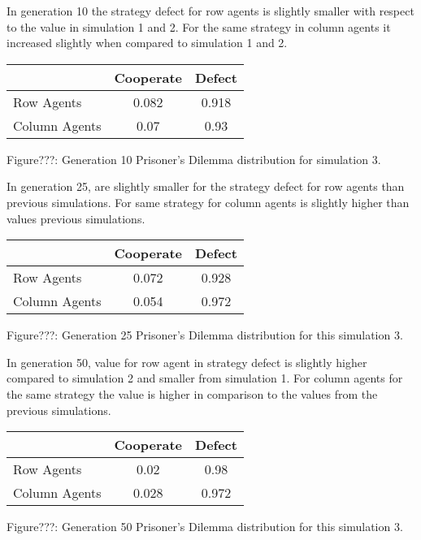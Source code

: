 \documentclass{article}
\begin{document}
In generation 10 the strategy defect for row agents is slightly smaller with respect to the value in simulation 1 and 2. For the same strategy in column agents it increased slightly when compared to simulation 1 and 2.
\begin{center}
\begin{tabular}{|l|c|c|}
\hline
& Cooperate & Defect \\ 
\hline
Row Agents & 0.082 & 0.918\\
\hline
Column Agents & 0.07 & 0.93\\
\hline
\end{tabular}
\end{center}
\begin{center}
Figure???: Generation 10 Prisoner’s Dilemma distribution for simulation 3.
\end{center}

In generation 25, are slightly smaller for the strategy defect for row agents than previous simulations. For same strategy for column agents is slightly higher than values previous simulations.
\begin{center}
\begin{tabular}{|l|c|c|}
\hline
& Cooperate & Defect \\ 
\hline
Row Agents & 0.072 & 0.928\\
\hline
Column Agents & 0.054 & 0.972\\
\hline
\end{tabular}
\end{center}
\begin{center}
Figure???: Generation 25 Prisoner’s Dilemma distribution for this simulation 3.
\end{center}


In generation 50, value for row agent in strategy defect is slightly higher compared to simulation 2  and smaller from simulation 1. For column agents for the same strategy the value is higher in comparison to the values from the previous simulations.
\begin{center}
\begin{tabular}{|l|c|c|}
\hline
& Cooperate & Defect \\ 
\hline
Row Agents & 0.02 & 0.98\\
\hline
Column Agents & 0.028 & 0.972\\
\hline
\end{tabular}
\end{center}
\begin{center}
Figure???: Generation 50 Prisoner’s Dilemma distribution for this simulation 3.
\end{center}
\end{document}
